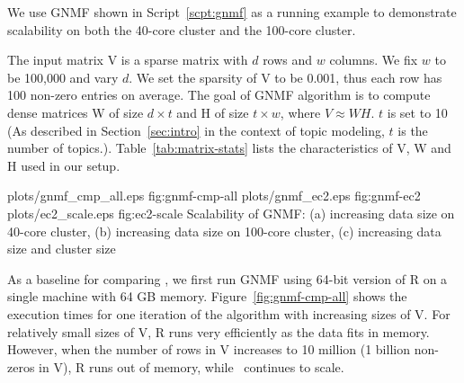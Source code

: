 We use GNMF shown in Script~\ref{scpt:gnmf} as a running example to demonstrate
scalability on both the 40-core cluster and the 100-core cluster.

The input matrix V is a sparse matrix with $d$ rows and $w$ columns. We fix $w$ to be 100,000 and vary $d$. We
set the sparsity of V to be 0.001, thus each row has 100 non-zero entries on average. The goal of GNMF
algorithm is to compute dense matrices W of size $d\times t$ and H of size $t\times w$, where
$V\approx W H$. $t$ is set to 10 (As described in Section~\ref{sec:intro} in the context of topic modeling, $t$ is the number of topics.). Table~\ref{tab:matrix-stats} lists the characteristics of V, W and H used in our setup.

\some
{plots/gnmf_cmp_all.eps}
{fig:gnmf-cmp-all}
{plots/gnmf_ec2.eps}
{fig:gnmf-ec2}
{plots/ec2_scale.eps}
{fig:ec2-scale}
{Scalability of GNMF: (a) increasing data size on 40-core cluster, (b) increasing data size on 100-core cluster, (c) increasing data size and cluster size}

 As a baseline for
comparing \systemmltext, we first run GNMF using 64-bit version of R on a single machine with 64 GB
memory. Figure~\ref{fig:gnmf-cmp-all} shows the execution times for one iteration of the algorithm
with increasing sizes of V. For relatively small sizes of V, R runs very efficiently as the data fits in memory. 
However, when the number of rows in V increases to 10 million (1 billion
non-zeros in V), R runs out of memory, while \systemmltext\ continues to scale.

